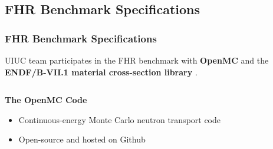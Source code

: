 \subsection{FHR Benchmark Specifications}
\begin{frame}
    \frametitle{FHR Benchmark Specifications}
    UIUC team participates in the FHR benchmark with \textbf{OpenMC} \cite{romano_openmc:_2015} 
    and the \textbf{ENDF/B-VII.1 material cross-section library} \cite{chadwick_endf/b-vii.1_2011}. 

\begin{columns}[t]
    \begin{column}{0.5\textwidth}
        \vspace{0.3cm}
        \textbf{The OpenMC Code} 
        \begin{itemize}
            \item Continuous-energy Monte Carlo neutron transport code 
            \item Open-source and hosted on Github 
        \end{itemize}
    

\end{column}
\end{columns}
\end{frame}
